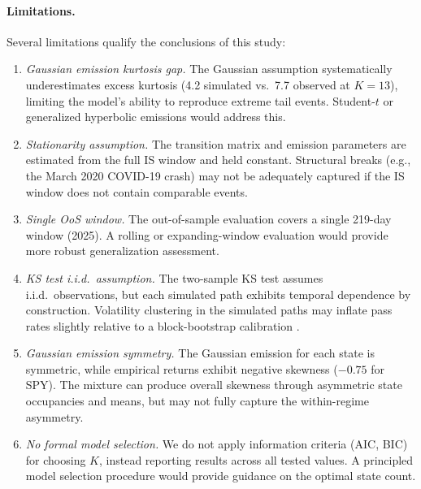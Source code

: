 \paragraph{Limitations.}
Several limitations qualify the conclusions of this study:
\begin{enumerate}
    \item \textit{Gaussian emission kurtosis gap.}
    The Gaussian assumption systematically underestimates excess kurtosis (4.2 simulated vs.\ 7.7 observed at $K = 13$), limiting the model's ability to reproduce extreme tail events.
    Student-$t$ or generalized hyperbolic emissions would address this.

    \item \textit{Stationarity assumption.}
    The transition matrix and emission parameters are estimated from the full IS window and held constant.
    Structural breaks (e.g., the March 2020 COVID-19 crash) may not be adequately captured if the IS window does not contain comparable events.

    \item \textit{Single OoS window.}
    The out-of-sample evaluation covers a single 219-day window (2025).
    A rolling or expanding-window evaluation would provide more robust generalization assessment.

    \item \textit{KS test i.i.d.\ assumption.}
    The two-sample KS test assumes i.i.d.\ observations, but each simulated path exhibits temporal dependence by construction.
    Volatility clustering in the simulated paths may inflate pass rates slightly relative to a block-bootstrap calibration \citep{alswaidan2026hybrid}.

    \item \textit{Gaussian emission symmetry.}
    The Gaussian emission for each state is symmetric, while empirical returns exhibit negative skewness ($-0.75$ for SPY).
    The mixture can produce overall skewness through asymmetric state occupancies and means, but may not fully capture the within-regime asymmetry.

    \item \textit{No formal model selection.}
    We do not apply information criteria (AIC, BIC) for choosing $K$, instead reporting results across all tested values.
    A principled model selection procedure would provide guidance on the optimal state count.
\end{enumerate}
